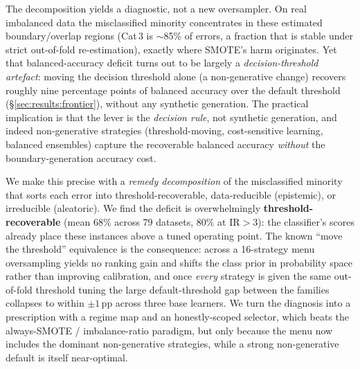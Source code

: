 The decomposition yields a diagnostic, not a new oversampler. On real imbalanced
data the misclassified minority concentrates in these estimated boundary/overlap
regions (Cat\,3 is $\sim$85\% of errors, a fraction that is stable under strict
out-of-fold re-estimation), exactly where SMOTE's harm originates. Yet that
balanced-accuracy deficit turns out to be largely a \emph{decision-threshold
artefact}: moving the decision threshold alone (a non-generative change)
recovers roughly nine percentage points of balanced accuracy over the default
threshold (\S\ref{sec:results:frontier}), without any synthetic generation. The practical implication is that the lever is
the \emph{decision rule}, not synthetic generation, and indeed non-generative
strategies (threshold-moving, cost-sensitive learning, balanced ensembles)
capture the recoverable balanced accuracy \emph{without} the boundary-generation
accuracy cost.

We make this precise with a \emph{remedy decomposition} of the misclassified
minority that sorts each error into threshold-recoverable, data-reducible
(epistemic), or irreducible (aleatoric). We find the deficit is overwhelmingly
\textbf{threshold-recoverable} (mean $68\%$ across 79 datasets, $80\%$ at
$\mathrm{IR}>3$): the classifier's scores already place these instances above a
tuned operating point. The known
``move the threshold'' equivalence
\cite{provost2000imbalanced,elkan2001foundations,elor2022smote,goorbergh2022harm}
is the consequence: across a 16-strategy menu oversampling yields no ranking gain
and shifts the class prior in probability space rather than improving
calibration, and once \emph{every} strategy is given the same
out-of-fold threshold tuning the large default-threshold gap between the families
collapses to within $\pm1$\,pp across three base learners.
We turn the diagnosis into a prescription with a regime map and an
honestly-scoped selector, which beats the always-SMOTE / imbalance-ratio
paradigm, but only because the menu now includes the dominant non-generative
strategies, while a strong non-generative default is itself near-optimal.

